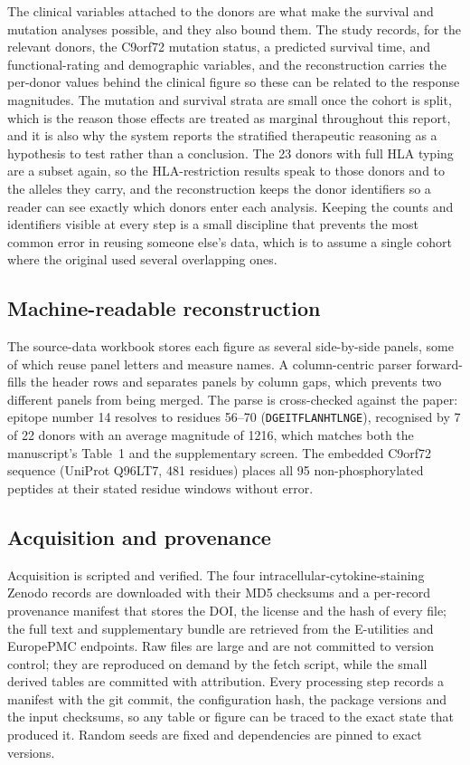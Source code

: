 \documentclass[11pt]{article}
\begin{document}
The clinical variables attached to the donors are what make the survival and mutation analyses
possible, and they also bound them. The study records, for the relevant donors, the C9orf72 mutation
status, a predicted survival time, and functional-rating and demographic variables, and the
reconstruction carries the per-donor values behind the clinical figure so these can be related to the
response magnitudes. The mutation and survival strata are small once the cohort is split, which is
the reason those effects are treated as marginal throughout this report, and it is also why the
system reports the stratified therapeutic reasoning as a hypothesis to test rather than a conclusion.
The 23 donors with full HLA typing are a subset again, so the HLA-restriction results speak to those
donors and to the alleles they carry, and the reconstruction keeps the donor identifiers so a reader
can see exactly which donors enter each analysis. Keeping the counts and identifiers visible at every
step is a small discipline that prevents the most common error in reusing someone else's data, which
is to assume a single cohort where the original used several overlapping ones.

\subsection{Machine-readable reconstruction}
The source-data workbook stores each figure as several side-by-side panels, some of which reuse
panel letters and measure names. A column-centric parser forward-fills the header rows and
separates panels by column gaps, which prevents two different panels from being merged. The parse
is cross-checked against the paper: epitope number 14 resolves to residues 56--70
(\texttt{DGEITFLANHTLNGE}), recognised by 7 of 22 donors with an average magnitude of 1216, which
matches both the manuscript's Table~1 and the supplementary screen. The embedded C9orf72 sequence
(UniProt Q96LT7, 481 residues) places all 95 non-phosphorylated peptides at their stated residue
windows without error.

\subsection{Acquisition and provenance}
Acquisition is scripted and verified. The four intracellular-cytokine-staining Zenodo records are
downloaded with their MD5 checksums and a per-record provenance manifest that stores the DOI, the
license and the hash of every file; the full text and supplementary bundle are retrieved from the
E-utilities and EuropePMC endpoints. Raw files are large and are not committed to version control;
they are reproduced on demand by the fetch script, while the small derived tables are committed with
attribution. Every processing step records a manifest with the git commit, the configuration hash,
the package versions and the input checksums, so any table or figure can be traced to the exact
state that produced it. Random seeds are fixed and dependencies are pinned to exact versions.
\end{document}
